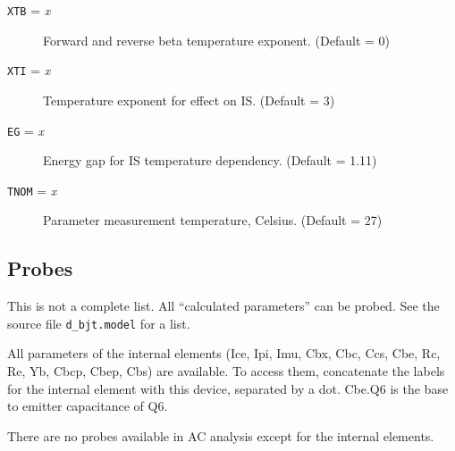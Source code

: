 \begin{description}

\item[{\tt XTB} = {\it x}]
Forward and reverse beta temperature exponent.  (Default = 0)

\item[{\tt XTI} = {\it x}]
Temperature exponent for effect on IS.  (Default = 3)

\item[{\tt EG} = {\it x}]
Energy gap for IS temperature dependency.  (Default = 1.11)

\item[{\tt TNOM} = {\it x}]
Parameter measurement temperature, Celsius.  (Default = 27)

\end{description}
\subsection{Probes}

This is not a complete list.  All ``calculated parameters'' can be
probed.  See the source file {\tt d\_bjt.model} for a list.

All parameters of the internal elements (Ice, Ipi, Imu, Cbx, Cbc, Ccs,
Cbe, Rc, Re, Yb, Cbcp, Cbep, Cbs) are available.  To access them,
concatenate the labels for the internal element with this device,
separated by a dot.  Cbe.Q6 is the base to emitter capacitance of Q6.

There are no probes available in AC analysis except for the internal
elements.

